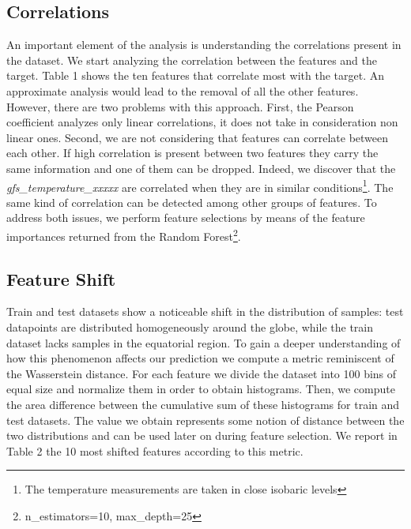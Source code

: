 \documentclass{article}
\begin{document}
    \subsection{Correlations}
    An important element of the analysis is understanding the correlations present in the dataset. We start analyzing the correlation between the features and the target. Table 1 shows the ten features that correlate most with the target. An approximate analysis would lead to the removal of all the other features. However, there are two problems with this approach. First, the Pearson coefficient analyzes only linear correlations, it does not take in consideration non linear ones. Second, we are not considering that features can correlate between each other. If high correlation is present between two features they carry the same information and one of them can be dropped. Indeed, we discover that the \textit{gfs\_temperature\_xxxxx} are correlated when they are in similar conditions\footnote{The temperature measurements are taken in close isobaric levels}. The same kind of correlation can be detected among other groups of features. To address both issues, we perform feature selections by means of the feature importances returned from the Random Forest\footnote{n\_estimators=10, max\_depth=25}.  
    
    \subsection{Feature Shift}
    Train and test datasets show a noticeable shift in the distribution of samples: test datapoints are distributed homogeneously around the globe, while the train dataset lacks samples in the equatorial region. To gain a deeper understanding of how this phenomenon affects our prediction we compute a metric reminiscent of the Wasserstein distance. For each feature we divide the dataset into 100 bins of equal size and normalize them in order to obtain histograms. Then, we compute the area difference between the cumulative sum of these histograms for train and test datasets. The value we obtain represents some notion of distance between the two distributions and can be used later on during feature selection. We report in Table 2 the 10 most shifted features according to this metric. 
\end{document}
